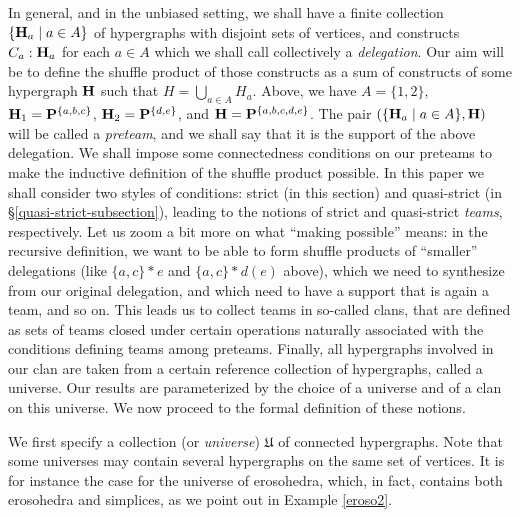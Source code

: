 \documentclass[11pt]{article}
\theoremstyle{definition}
\numberwithin{equation}{section}
\numberwithin{equation}{section}
\newcommand{\set}[1]{\{#1\}}
\newcommand{\setc}[2]{\set{#1 \mid #2}}
\newcommand{\Union}{\bigcup}		%
\newcommand{\hyper}[1]{{\bf #1}}
\begin{document}
In general, and in the unbiased setting, we shall  have a finite collection   $\setc{\hyper{H}_a}{a\in A}$ of hypergraphs with disjoint sets of vertices, and constructs $C_a:\hyper{H}_a$ for each $a\in A$ which we shall call collectively a \textit{delegation}.
Our aim will be  to define the shuffle product of those constructs  as a sum of constructs of some hypergraph $\hyper{H}$ such that $H=\Union_{a\in A}H_a$. Above, we have $A=\set{1,2}$,
 $\hyper{H}_1 = \hyper{P}^{\set{a,b,c}}$, $\hyper{H}_2 = \hyper{P}^{\set{d,e}}$, and $\hyper{H}=\hyper{P}^{\set{a,b,c,d,e}}$. The pair $(\setc{\hyper{H}_a}{a\in A},\hyper{H})$ will be called a \textit{preteam}, and we shall say that it is the support of the above delegation.  We shall impose some connectedness conditions on our preteams to make the inductive definition of the shuffle product possible.  In this paper we shall consider two styles of conditions: strict (in this section) and quasi-strict (in \S\ref{quasi-strict-subsection}), leading to the notions of strict and quasi-strict \textit{teams}, respectively.  Let us zoom a bit more on what ``making possible'' means:  in the recursive definition, we want to be able to form shuffle products of ``smaller'' delegations (like $\{a,c\}\ast e$ and $\{a,c\}\ast d(e)$ above), which we need to synthesize from our original delegation, and which need to have a  support that is again a team, and so on.  This leads us to collect teams in so-called clans, that are defined as sets of teams closed under certain operations naturally associated with the conditions defining teams among preteams. Finally, all hypergraphs involved in our clan are taken from a certain reference collection of hypergraphs, called a universe. Our results are parameterized by the choice of a universe and of a clan on this universe. We now proceed to the formal definition of these notions.



We first specify a collection (or {\em universe}) $\mathfrak U$ of connected hypergraphs.  Note that some universes may contain several hypergraphs on the same set of vertices. It is for instance the case for the universe of erosohedra,  which, in fact, contains both erosohedra and simplices, as we point out in  Example \ref{eroso2}.
\end{document}
